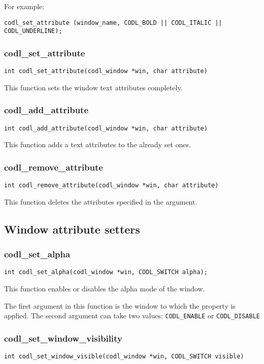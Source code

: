 \documentclass{article}
\newcommand{\fstep}{\vspace{3mm}\noindent}
\begin{document}
\noindent\vspace{3mm} For example:

{\tt codl\_set\_attribute (window\_name, CODL\_BOLD || CODL\_ITALIC || CODL\_UNDERLINE);}

\subsubsection{codl\_set\_attribute}
{\tt int codl\_set\_attribute(codl\_window *win, char attribute)}

\fstep{} This function sets the window text attributes completely.

\subsubsection{codl\_add\_attribute}
{\tt int codl\_add\_attribute(codl\_window *win, char attribute)}

\noindent\vspace{3mm} This function adds a text attributes to the already set
ones.

\subsubsection{codl\_remove\_attribute} 
{\tt int codl\_remove\_attribute(codl\_window *win, char attribute)}

\fstep{} This function deletes the attributes specified in the
argument.

\subsection{Window attribute setters}

\subsubsection{codl\_set\_alpha}
{\tt int codl\_set\_alpha(codl\_window *win, CODL\_SWITCH alpha);}

\fstep{} This function enables or disables the alpha mode of the window.

The first argument in this function is the window to which the property is applied.
The second argument can take two values: {\tt CODL\_ENABLE} or {\tt CODL\_DISABLE}

\subsubsection{codl\_set\_window\_visibility}
{\tt int codl\_set\_window\_visible(codl\_window *win, CODL\_SWITCH visible)}
\end{document}
